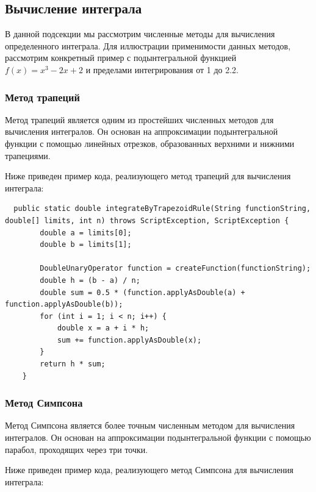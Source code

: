 \documentclass[12pt]{article}
\begin{document}
    \subsection{Вычисление интеграла}

    В данной подсекции мы рассмотрим численные методы для вычисления определенного интеграла. Для иллюстрации применимости данных методов, рассмотрим конкретный пример с подынтегральной функцией $f(x) = x^3 - 2x +2$ и пределами интегрирования от 1 до 2.2.

    \subsubsection{Метод трапеций}

    Метод трапеций является одним из простейших численных методов для вычисления интегралов. Он основан на аппроксимации подынтегральной функции с помощью линейных отрезков, образованных верхними и нижними трапециями.

    Ниже приведен пример кода, реализующего метод трапеций для вычисления интеграла:

    \begin{verbatim}
  public static double integrateByTrapezoidRule(String functionString, double[] limits, int n) throws ScriptException, ScriptException {
        double a = limits[0];
        double b = limits[1];

        DoubleUnaryOperator function = createFunction(functionString);
        double h = (b - a) / n;
        double sum = 0.5 * (function.applyAsDouble(a) + function.applyAsDouble(b));
        for (int i = 1; i < n; i++) {
            double x = a + i * h;
            sum += function.applyAsDouble(x);
        }
        return h * sum;
    }
    \end{verbatim}

    \subsubsection{Метод Симпсона}

    Метод Симпсона является более точным численным методом для вычисления интегралов. Он основан на аппроксимации подынтегральной функции с помощью парабол, проходящих через три точки.

    Ниже приведен пример кода, реализующего метод Симпсона для вычисления интеграла:
\end{document}
